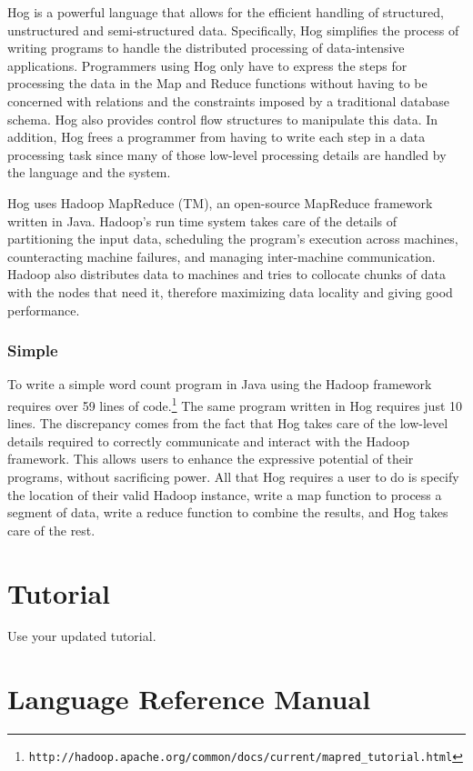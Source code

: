 \documentclass{book}
\begin{document}
Hog is a powerful language that allows for the efficient handling of
structured, unstructured and semi-structured data. Specifically, Hog simplifies
the process of writing programs to handle the distributed processing of
data-intensive applications. Programmers using Hog only have to express the
steps for processing the data in the Map and Reduce functions without having to
be concerned with relations and the constraints imposed by a traditional
database schema. Hog also provides control flow structures to manipulate this
data. In addition, Hog frees a programmer from having to write each step in a
data processing task since many of those low-level processing details are
handled by the language and the system.

Hog uses Hadoop MapReduce (TM), an open-source MapReduce framework written in
Java. Hadoop’s run time system takes care of the details of partitioning the
input data, scheduling the program’s execution across machines, counteracting
machine failures, and managing inter-machine communication. Hadoop also
distributes data to machines and tries to collocate chunks of data with the
nodes that need it, therefore maximizing data locality and giving good
performance.

\subsection{Simple}
\label{sub:simple}

To write a simple word count program in Java using the Hadoop framework
requires over 59 lines of
code.\footnote{\texttt{http://hadoop.apache.org/common/docs/current/mapred\_tutorial.html}}
The same program written in Hog requires just 10 lines. The discrepancy comes
from the fact that Hog takes care of the low-level details required to
correctly communicate and interact with the Hadoop framework. This allows users
to enhance the expressive potential of their programs, without sacrificing
power. All that Hog requires a user to do is specify the location of their
valid Hadoop instance, write a map function to process a segment of data, write
a reduce function to combine the results, and Hog takes care of the rest.

\chapter{Tutorial}
\label{chap:tutor}

Use your updated tutorial.

\chapter{Language Reference Manual}
\label{chap:LRM}
\end{document}
